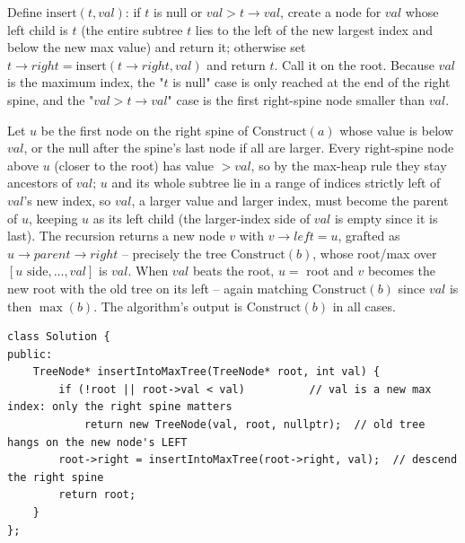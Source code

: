 Define $\text{insert}(t, \mathit{val})$: if $t$ is null or $\mathit{val} > t\to\mathit{val}$, create a node
for $\mathit{val}$ whose left child is $t$ (the entire subtree $t$ lies to the left of the new largest
index and below the new max value) and return it; otherwise set $t\to\mathit{right} =
\text{insert}(t\to\mathit{right}, \mathit{val})$ and return $t$. Call it on the root. Because $\mathit{val}$
is the maximum index, the "$t$ is null" case is only reached at the end of the right spine, and the
"$\mathit{val} > t\to\mathit{val}$" case is the first right-spine node smaller than $\mathit{val}$.

\begin{proofbox}
Let $u$ be the first node on the right spine of $\text{Construct}(a)$ whose value is below $\mathit{val}$,
or the null after the spine's last node if all are larger. Every right-spine node above $u$ (closer to the
root) has value $>\mathit{val}$, so by the max-heap rule they stay ancestors of $\mathit{val}$; $u$ and its
whole subtree lie in a range of indices strictly left of $\mathit{val}$'s new index, so $\mathit{val}$, a
larger value and larger index, must become the parent of $u$, keeping $u$ as its left child (the
larger-index side of $\mathit{val}$ is empty since it is last). The recursion returns a new node $v$ with
$v\to\mathit{left}=u$, grafted as $u\to\mathit{parent}\to\mathit{right}$ -- precisely the tree
$\text{Construct}(b)$, whose root/max over $[u\text{ side},\dots,\mathit{val}]$ is $\mathit{val}$. When
$\mathit{val}$ beats the root, $u=$ root and $v$ becomes the new root with the old tree on its left -- again
matching $\text{Construct}(b)$ since $\mathit{val}$ is then $\max(b)$. The algorithm's output is
$\text{Construct}(b)$ in all cases. \end{proofbox}

\begin{lstlisting}[caption={Maximum Binary Tree II -- one descent down the right spine (LeetCode 998)}, label={lst:c26-mbt2-soln}]
class Solution {
public:
    TreeNode* insertIntoMaxTree(TreeNode* root, int val) {
        if (!root || root->val < val)          // val is a new max index: only the right spine matters
            return new TreeNode(val, root, nullptr);  // old tree hangs on the new node's LEFT
        root->right = insertIntoMaxTree(root->right, val);  // descend the right spine
        return root;
    }
};
\end{lstlisting}

